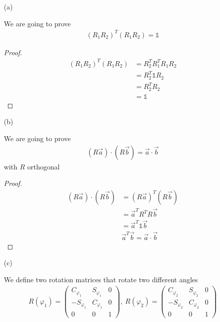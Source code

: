 \documentclass[11pt,a4paper]{article}
\begin{document}
\begin{enumerate}

\item[(a)]

We are going to prove
\begin{align*}
(R_1R_2)^T(R_1R_2)=\mathbb{1}
\end{align*}

\begin{proof}

\begin{align*}
(R_1R_2)^T(R_1R_2)
&=R_2^T R_1^T R_1 R_2 \\
&=R_2^T \mathbb{1} R_2 \\
&=R_2^T R_2 \\
&=\mathbb{1}
\end{align*}

\end{proof}

\item[(b)]

We are going to prove
\begin{align*}
(R\vec{a})\cdot(R\vec{b})=\vec{a}\cdot\vec{b}
\end{align*}
with $R$ orthogonal

\begin{proof}

\begin{align*}
(R\vec{a})\cdot(R\vec{b})
&=(R\vec{a})^T(R\vec{b}) \\
&=\vec{a}^T R^T R \vec{b} \\
&=\vec{a}^T \mathbb{1} \vec{b} \\
&\vec{a}^T \vec{b}=\vec{a}\cdot\vec{b}
\end{align*}

\end{proof}

\item[(c)]

We define two rotation matrices that rotate two different angles
\begin{align*}
R(\varphi_1)=
\begin{pmatrix}
C_{\varphi_1} & S_{\varphi_1} & 0 \\
-S_{\varphi_1} & C_{\varphi_1} & 0 \\
0 & 0 & 1
\end{pmatrix},\ 
R(\varphi_2)=
\begin{pmatrix}
C_{\varphi_2} & S_{\varphi_2} & 0 \\
-S_{\varphi_2} & C_{\varphi_2} & 0 \\
0 & 0 & 1
\end{pmatrix}
\end{align*}


\end{enumerate}
\end{document}
